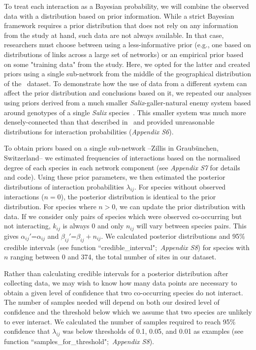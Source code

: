 \documentclass[12pt]{article}
\begin{document}
\begin{spacing}{2.0}
        To treat each interaction as a Bayesian probability, we will combine the observed data with a distribution based on prior information. While a strict Bayesian framework requires a prior distribution that does not rely on any information from the study at hand, such data are not always available. In that case, researchers must choose between using a less-informative prior (e.g., one based on distributions of links across a large set of networks) or an empirical prior based on some "training data" from the study. Here, we opted for the latter and created priors using a single sub-network from the middle of the geographical distribution of the~\citet{Kopelke2017} dataset. To demonstrate how the use of data from a different system can affect the prior distribution and conclusions based on it, we repeated our analyses using priors derived from a much smaller \emph{Salix}-galler-natural enemy system based around genotypes of a single \emph{Salix} species~\citep[Data available from the Dryad Digital Repository: https://doi.org/10.5061/dryad.g7805]{Barbour2016}\nocite{Barbour2016Dryad}. This smaller system was much more densely-connected than that described in~\citet{Kopelke2017} and provided unreasonable distributions for interaction probabilities (\emph{Appendix S6}). 


        To obtain priors based on a single sub-network --Zillis in Graub\"{u}nchen, Switzerland-- we estimated frequencies of interactions based on the normalised degree of each species in each network component (see \emph{Appendix S7} for details and code). Using these prior parameters, we then estimated the posterior distributions of interaction probabilities $\lambda_{ij}$. For species without observed interactions ($n = 0$), the posterior distribution is identical to the prior distribution. For species where $n>0$, we can update the prior distribution with data. If we consider only pairs of species which were observed co-occurring but not interacting, $k_{ij}$ is always 0 and only $n_{ij}$ will vary between species pairs. This gives $\alpha_{ij}'$=$\alpha_{ij}$ and $\beta_{ij}'$=$\beta_{ij} + n_{ij}$. We calculated posterior distributions and 95\% credible intervals (see function ``credible\_interval";~\emph{Appendix S8}) for species with $n$ ranging between 0 and 374, the total number of sites in our dataset. 


        Rather than calculating credible intervals for a posterior distribution after collecting data, we may wish to know how many data points are necessary to obtain a given level of confidence that two co-occurring species do not interact. The number of samples needed will depend on both our desired level of confidence and the threshold below which we assume that two species are unlikely to ever interact. We calculated the number of samples required to reach 95\% confidence that $\lambda_{ij}$ was below thresholds of 0.1, 0.05, and 0.01 as examples (see function ``samples\_for\_threshold";~\emph{Appendix S8}).



\end{spacing}
\end{document}
